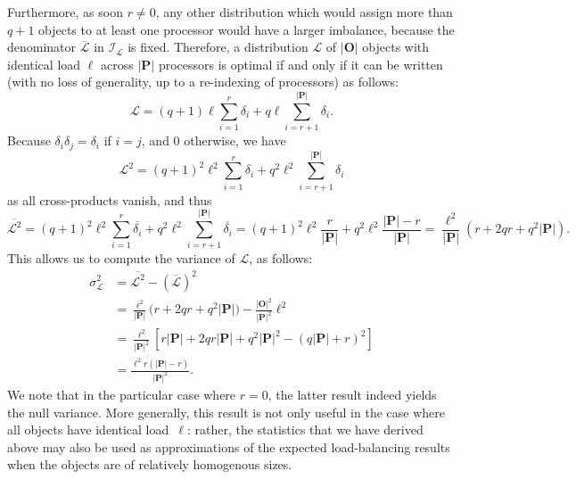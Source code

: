 Furthermore, as soon $r\neq0$, any other distribution which
would assign more than $q+1$ objects to at least one processor would
have a larger imbalance, because the denominator
$\overline{\mathcal{L}}$ in $\mathcal{I}_{\mathcal{L}}$ is fixed.
Therefore, a distribution $\mathcal{L}$ of
$\vert\mathbf{O}\vert$ objects with identical load $\ell$ across
$\vert\mathbf{P}\vert$ processors is optimal if and only if it can be
written (with no loss of generality, up to a re-indexing of
processors) as follows:
\[
\mathcal{L}=
(q+1)\ell \sum_{i=1}^{r}\delta_i
+ q\ell\!\sum_{i=r+1}^{\vert{\mathbf{P}}\vert}\delta_i.
\]
Because $\delta_i\delta_j=\delta_i$ if $i=j$, and $0$ otherwise, we have
\[
\mathcal{L}^2=
(q+1)^2\ell^2\sum_{i=1}^{r}\delta_i
+ q^2\ell^2\sum_{i=r+1}^{\vert{\mathbf{P}}\vert}\delta_i
\]
as all cross-products vanish, and thus
\[
\overline{\mathcal{L}^2}=
(q+1)^2\ell^2\sum_{i=1}^{r}\overline{\delta_i}
+ q^2\ell^2\sum_{i=r+1}^{\vert{\mathbf{P}}\vert}\overline{\delta_i}
= (q+1)^2\ell^2\frac{r}{\vert{\mathbf{P}}\vert}
+ q^2\ell^2\frac{\vert{\mathbf{P}}\vert-r}{\vert{\mathbf{P}}\vert}
= \frac{\ell^2}{\vert{\mathbf{P}}\vert}
(r + 2qr + q^2\vert{\mathbf{P}}\vert).
\]
This allows us to compute the variance of $\mathcal{L}$, as follows:
\begin{align*}
\sigma_{\mathcal{L}}^2
&= \overline{\mathcal{L}^2} - (\overline{\mathcal{L}})^2\\
&= \frac{\ell^2}{\vert{\mathbf{P}}\vert}
\big(r + 2qr + q^2\vert{\mathbf{P}}\vert\big)
- \frac{\vert\mathbf{O}\vert^2}{\vert\mathbf{P}\vert^2}\ell^2\\
&= \frac{\ell^2}{\vert{\mathbf{P}}\vert^2}
\left[r\vert{\mathbf{P}}\vert + 2qr\vert{\mathbf{P}}\vert
+ q^2\vert{\mathbf{P}}\vert^2 
- (q\vert{\mathbf{P}}\vert+r)^2\right]\\
&= \frac{\ell^2 r(\vert{\mathbf{P}}\vert - r)}
{\vert{\mathbf{P}}\vert^2}.
\end{align*}
We note that in the particular case where $r=0$, the latter result
indeed yields the null variance.
More generally, this result is not only useful in the case where
all objects have identical load~$\ell$: rather, the statistics that we
have derived above may also be used as approximations of the expected
load-balancing results when the objects are of relatively homogenous
sizes.

